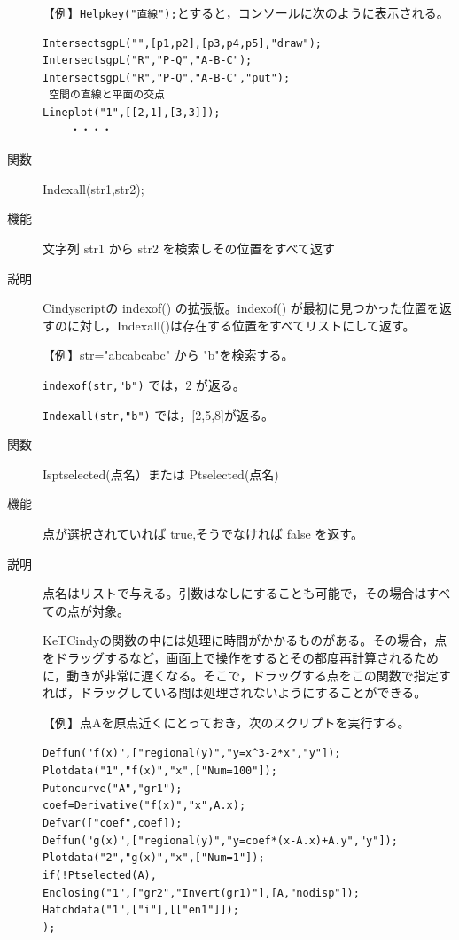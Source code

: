 \documentclass[papersize,a4paper,12pt,uplatex]{jsarticle}
\begin{document}
\begin{description}
\vspace{\baselineskip}
【例】\verb|Helpkey("直線");|とすると，コンソールに次のように表示される。
\begin{verbatim}
IntersectsgpL("",[p1,p2],[p3,p4,p5],"draw"); 
IntersectsgpL("R","P-Q","A-B-C"); 
IntersectsgpL("R","P-Q","A-B-C","put");
 空間の直線と平面の交点
Lineplot("1",[[2,1],[3,3]]);
 　　・・・・
\end{verbatim}

\vspace{\baselineskip}
\hypertarget{indexall}{}
\item[関数]Indexall(str1,str2);
\item[機能]文字列 str1 から str2 を検索しその位置をすべて返す
\item[説明]Cindyscriptの indexof() の拡張版。indexof() が最初に見つかった位置を返すのに対し，Indexall()は存在する位置をすべてリストにして返す。

\vspace{\baselineskip}
【例】str="abcabcabc" から "b"を検索する。

\verb|indexof(str,"b")| では，2 が返る。

\verb|Indexall(str,"b")| では，[2,5,8]が返る。

\vspace{\baselineskip}
\hypertarget{isptselected}{}
\item[関数]Isptselected(点名）または Ptselected(点名)
\item[機能]点が選択されていれば true,そうでなければ false を返す。
\item[説明]点名はリストで与える。引数はなしにすることも可能で，その場合はすべての点が対象。

KeTCindyの関数の中には処理に時間がかかるものがある。その場合，点をドラッグするなど，画面上で操作をするとその都度再計算されるために，動きが非常に遅くなる。そこで，ドラッグする点をこの関数で指定すれば，ドラッグしている間は処理されないようにすることができる。

\vspace{\baselineskip}
【例】点Aを原点近くにとっておき，次のスクリプトを実行する。

\verb|Deffun("f(x)",["regional(y)","y=x^3-2*x","y"]);|\\
\verb|Plotdata("1","f(x)","x",["Num=100"]);|\\
\verb|Putoncurve("A","gr1");|\\
\verb|coef=Derivative("f(x)","x",A.x);|\\
\verb|Defvar(["coef",coef]);|\\
\verb|Deffun("g(x)",["regional(y)","y=coef*(x-A.x)+A.y","y"]);|\\
\verb|Plotdata("2","g(x)","x",["Num=1"]);|\\
\verb|if(!Ptselected(A),|\\
\verb|Enclosing("1",["gr2","Invert(gr1)"],[A,"nodisp"]);|\\
\verb|Hatchdata("1",["i"],[["en1"]]);|\\
\verb|);|


\end{description}
\end{document}
